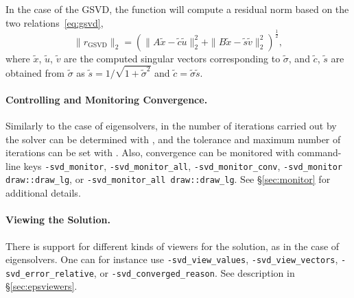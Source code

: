 In the case of the GSVD, the function  will compute a residual norm based on the two relations~\eqref{eq:gsvd},
\begin{equation}
\|r_\mathrm{GSVD}\|_2=\left(\|A\tilde{x}-\tilde{c}\tilde{u}\|_2^2+\|B\tilde{x}-\tilde{s}\tilde{v}\|_2^2\right)^{\frac{1}{2}},
\end{equation}
where $\tilde{x}$, $\tilde{u}$, $\tilde{v}$ are the computed singular vectors corresponding to $\tilde{\sigma}$, and $\tilde{c}$, $\tilde{s}$ are obtained from $\tilde{\sigma}$ as $\tilde{s}=1/\sqrt{1+\tilde{\sigma}^2}$ and $\tilde{c}=\tilde{\sigma}\tilde{s}$.

\paragraph{Controlling and Monitoring Convergence.}

Similarly to the case of eigensolvers, in  the number of iterations carried out by the solver can be determined with , and the tolerance and maximum number of iterations can be set with . Also, convergence can be monitored with command-line keys \Verb!-svd_monitor!, \Verb!-svd_monitor_all!, \Verb!-svd_monitor_conv!, \Verb!-svd_monitor draw::draw_lg!, or \Verb!-svd_monitor_all draw::draw_lg!. See \S\ref{sec:monitor} for additional details.

\paragraph{Viewing the Solution.}

There is support for different kinds of viewers for the solution, as in the case of eigensolvers. One can for instance use \Verb!-svd_view_values!, \Verb!-svd_view_vectors!, \Verb!-svd_error_relative!, or \Verb!-svd_converged_reason!. See description in \S\ref{sec:epsviewers}.

